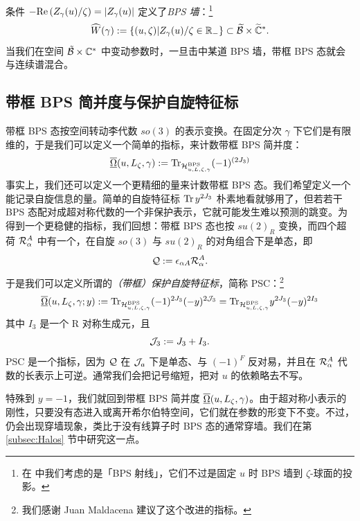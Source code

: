 条件 $-{\rm Re}\, (Z_\gamma(u) / \zeta)= \vert Z_{\gamma}(u)\vert$ 定义了\emph{BPS 墙}：\footnote{在 \cite{Gaiotto:2008cd,Gaiotto:2009hg} 中我们考虑的是「BPS 射线」，它们不过是固定 $u$ 时 BPS 墙到 $\zeta$-球面的投影。}
\begin{equation}\label{eq:Def-BPS-Walls}
\widehat W(\gamma ):=\{ (u,\zeta) \vert Z_{\gamma}(u)/\zeta \in
\mathbb{R}_- \}\subset \widetilde {\mathcal{B}} \times \widetilde{\mathbb{C}}^*.
\end{equation}
当我们在空间 $\tilde {\mathcal{B}} \times \mathbb{C}^*$ 中变动参数时，一旦击中某道 BPS 墙，带框 BPS 态就会与连续谱混合。

\subsection{带框 BPS 简并度与保护自旋特征标}
\label{subsec:BPS-Deg-PSC}

带框 BPS 态按空间转动李代数 $so(3)$ 的表示变换。在固定分次 $\gamma$ 下它们是有限维的，于是我们可以定义一个简单的指标，来计数带框 BPS 简并度：
\begin{equation}
\overline{\underline{\Omega}}(u,L_\zeta, \gamma) := {\rm Tr}_{\mathcal{H}_{u,L,\zeta,\gamma}^{\rm
BPS}} (-1)^{(2J_3)}
\end{equation}
事实上，我们还可以定义一个更精细的量来计数带框 BPS 态。我们希望定义一个能记录自旋信息的量。简单的自旋特征标 ${\rm Tr}\, y^{2J_3}$ 朴素地看就够用了，但若若干 BPS 态配对成超对称代数的一个非保护表示，它就可能发生难以预测的跳变。为得到一个更稳健的指标，我们回想：带框 BPS 态也按 $su(2)_R$ 变换，而四个超荷 $\mathcal{R}_\alpha^A$ 中有一个，在自旋 $so(3)$ 与 $su(2)_R$ 的对角组合下是单态，即
\begin{equation}
\mathcal{Q} := \epsilon_{\alpha A} \mathcal{R}_{\alpha}^A.
\end{equation}
于是我们可以定义所谓的\emph{（带框）保护自旋特征标}，简称 PSC：\footnote{我们感谢 Juan Maldacena 建议了这个改进的指标。}
\begin{equation}\label{eq:Def-Framed-PSC}
\overline{\underline{\Omega}}(u,L_\zeta, \gamma;y) := {\rm Tr}_{\mathcal{H}_{u,L,\zeta,\gamma}^{\rm
BPS}} (-1)^{2J_3} (-y)^{2\mathcal{J}_3} = {\rm Tr}_{\mathcal{H}_{u,L,\zeta,\gamma}^{\rm
BPS}} y^{2J_3} (-y)^{2I_3}
\end{equation}
其中 $I_3$ 是一个 R 对称生成元，且
\begin{equation}
\mathcal{J}_3 := J_3 + I_3.
\end{equation}
PSC 是一个指标，因为 $\mathcal{Q}$ 在 $\mathcal{J}_a$ 下是单态、与 $(-1)^F$ 反对易，并且在 $\mathcal{R}_{\alpha}^A$ 代数的长表示上可逆。通常我们会把记号缩短，把对 $u$ 的依赖略去不写。

特殊到 $y=-1$，我们就回到带框 BPS 简并度 $\overline{\underline{\Omega}}(u,L_\zeta, \gamma)$。由于超对称小表示的刚性，只要没有态进入或离开希尔伯特空间，它们就在参数的形变下不变。不过，仍会出现穿墙现象，类比于没有线算子时 BPS 态的通常穿墙。我们在第 \ref{subsec:Halos} 节中研究这一点。

